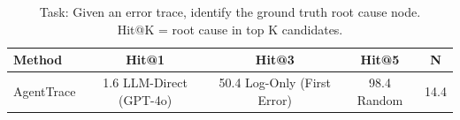 
\begin{table}[t]
\centering
\caption{Root Cause Localization: Fair Comparison (Same Task, Same Metric)}
\label{tab:fair_comparison}
\begin{tabular}{lcccc}
\toprule
\textbf{Method} & \textbf{Hit@1} & \textbf{Hit@3} & \textbf{Hit@5} & \textbf{N} \\
\midrule
AgentTrace & 1.6%
LLM-Direct (GPT-4o) & 50.4%
Log-Only (First Error) & 98.4%
Random & 14.4%

\bottomrule
\end{tabular}
\vspace{0.5em}
\caption*{Task: Given an error trace, identify the ground truth root cause node.\\
Hit@K = root cause in top K candidates.}
\end{table}
